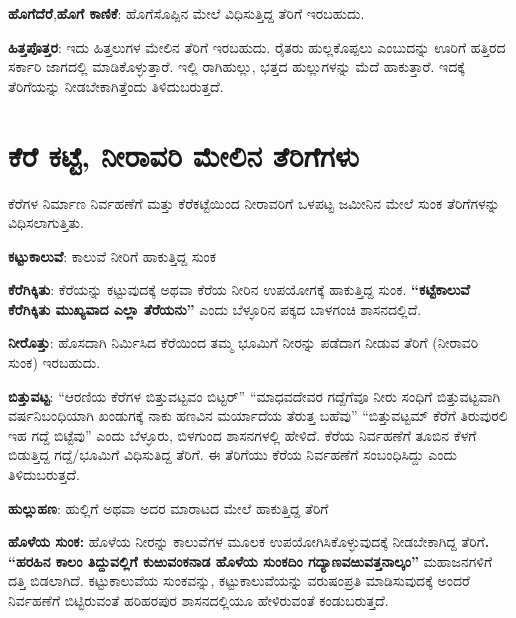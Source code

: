 \textbf{ಹೊಗೆದೆರೆ},\textbf{ಹೊಗೆ ಕಾಣಿಕೆ}: ಹೊಗೆಸೊಪ್ಪಿನ ಮೇಲೆ ವಿಧಿಸುತ್ತಿದ್ದ ತೆರಿಗೆ ಇರಬಹುದು.

\textbf{ಹಿತ್ತಪೊತ್ತರ}: ಇದು ಹಿತ್ತಲುಗಳ ಮೇಲಿನ ತೆರಿಗೆ ಇರಬಹುದು. ರೈತರು ಹುಲ್ಲಕೊಪ್ಪಲು ಎಂಬುದನ್ನು ಊರಿಗೆ ಹತ್ತಿರದ ಸರ್ಕಾರಿ ಜಾಗದಲ್ಲಿ ಮಾಡಿಕೊಳ್ಳುತ್ತಾರೆ. ಇಲ್ಲಿ ರಾಗಿಹುಲ್ಲು, ಭತ್ತದ ಹುಲ್ಲುಗಳನ್ನು ಮೆದೆ ಹಾಕುತ್ತಾರೆ. ಇದಕ್ಕೆ ತೆರಿಗೆಯನ್ನು ನೀಡಬೇಕಾಗಿತ್ತೆಂದು ತಿಳಿದುಬರುತ್ತದೆ.

\section*{ಕೆರೆ ಕಟ್ಟೆ, ನೀರಾವರಿ ಮೇಲಿನ ತೆರಿಗೆಗಳು}

ಕೆರೆಗಳ ನಿರ್ಮಾಣ ನಿರ್ವಹಣೆಗೆ ಮತ್ತು ಕೆರೆಕಟ್ಟೆಯಿಂದ ನೀರಾವರಿಗೆ ಒಳಪಟ್ಟ ಜಮೀನಿನ ಮೇಲೆ ಸುಂಕ ತೆರಿಗೆಗಳನ್ನು ವಿಧಿಸಲಾಗುತ್ತಿತು.

\textbf{ಕಟ್ಟುಕಾಲುವೆ}: ಕಾಲುವೆ ನೀರಿಗೆ ಹಾಕುತ್ತಿದ್ದ ಸುಂಕ

\textbf{ಕೆರೆಗಿಕ್ಕಿತು}: ಕೆರೆಯನ್ನು ಕಟ್ಟುವುದಕ್ಕೆ ಅಥವಾ ಕೆರೆಯ ನೀರಿನ ಉಪಯೋಗಕ್ಕೆ ಹಾಕುತ್ತಿದ್ದ ಸುಂಕ. \textbf{“ಕಟ್ಟೆಕಾಲುವೆ ಕೆರೆಗಿಕ್ಕಿತು ಮುಖ್ಯವಾದ ಎಲ್ಲಾ ತೆರೆಯನು”} ಎಂದು ಬೆಳ್ಳೂರಿನ ಪಕ್ಕದ ಬಾಳಗಂಚಿ ಶಾಸನದಲ್ಲಿದೆ.

\textbf{ನೀರೊತ್ತು}: ಹೊಸದಾಗಿ ನಿರ್ಮಿಸಿದ ಕೆರೆಯಿಂದ ತಮ್ಮ ಭೂಮಿಗೆ ನೀರನ್ನು ಪಡೆದಾಗ ನೀಡುವ ತೆರಿಗೆ (ನೀರಾವರಿ ಸುಂಕ) ಇರಬಹುದು.

\textbf{ಬಿತ್ತುವಟ್ಟ}: “ಆರಣಿಯ ಕೆರೆಗಳ ಬಿತ್ತುವಟ್ಟವಂ ಬಿಟ್ಟರ್​” “ಮಾಧವದೇವರ ಗದ್ದೆಗೆವೂ ನೀರು ಸಂಧಿಗೆ ಬಿತ್ತುವಟ್ಟವಾಗಿ ವರ್ಷನಿಬಂಧಿಯಾಗಿ ಖಂಡುಗಕ್ಕೆ ನಾಕು ಹಣವಿನ ಮರ್ಯಾದೆಯ ತೆರುತ್ತ ಬಹೆವು” “ಬಿತ್ತುವಟ್ಟಮ್ ಕೆರೆಗೆ ತಿರುವುರಲಿ ಇಹ ಗದ್ದೆ ಬಿಟ್ಟೆವು” ಎಂದು ಬೆಳ್ಳೂರು, ಬಿಳಗುಂದ ಶಾಸನಗಳಲ್ಲಿ ಹೇಳಿದೆ. ಕೆರೆಯ ನಿರ್ವಹಣೆಗೆ ತೂಬಿನ ಕೆಳಗೆ ಬಿಡುತ್ತಿದ್ದ ಗದ್ದೆ/ಭೂಮಿಗೆ ವಿಧಿಸುತಿದ್ದ ತೆರಿಗೆ. ಈ ತೆರಿಗೆಯು ಕೆರೆಯ ನಿರ್ವಹಣೆಗೆ ಸಂಬಂಧಿಸಿದ್ದು ಎಂದು ತಿಳಿದುಬರುತ್ತದೆ.

\textbf{ಹುಲ್ಲುಹಣ}: ಹುಲ್ಲಿಗೆ ಅಥವಾ ಅದರ ಮಾರಾಟದ ಮೇಲೆ ಹಾಕುತ್ತಿದ್ದ ತೆರಿಗೆ

\textbf{ಹೊಳೆಯ ಸುಂಕ: } ಹೊಳೆಯ ನೀರನ್ನು ಕಾಲುವೆಗಳ ಮೂಲಕ ಉಪಯೋಗಿಸಿಕೊಳ್ಳುವುದಕ್ಕೆ ನೀಡಬೇಕಾಗಿದ್ದ ತೆರಿಗೆ\textbf{. “ಹರಹಿನ ಕಾಲಂ ತಿದ್ದುವಲ್ಲಿಗೆ ಕುಱುವಂಕನಾಡ ಹೊಳೆಯ ಸುಂಕದಿಂ ಗದ್ಯಾಣವಱುವತ್ತನಾಲ್ಕಂ” }ಮಹಾಜನಗಳಿಗೆ ದತ್ತಿ ಬಿಡಲಾಗಿದೆ. ಕಟ್ಟುಕಾಲುವೆಯ ಸುಂಕವನ್ನು, ಕಟ್ಟುಕಾಲುವೆಯನ್ನು ವರುಷಂಪ್ರತಿ ಮಾಡಿಸುವುದಕ್ಕೆ ಅಂದರೆ ನಿರ್ವಹಣೆಗೆ ಬಿಟ್ಟಿರುವಂತೆ ಹರಿಹರಪುರ ಶಾಸನದಲ್ಲಿಯೂ ಹೇಳಿರುವಂತೆ ಕಂಡುಬರುತ್ತದೆ.

